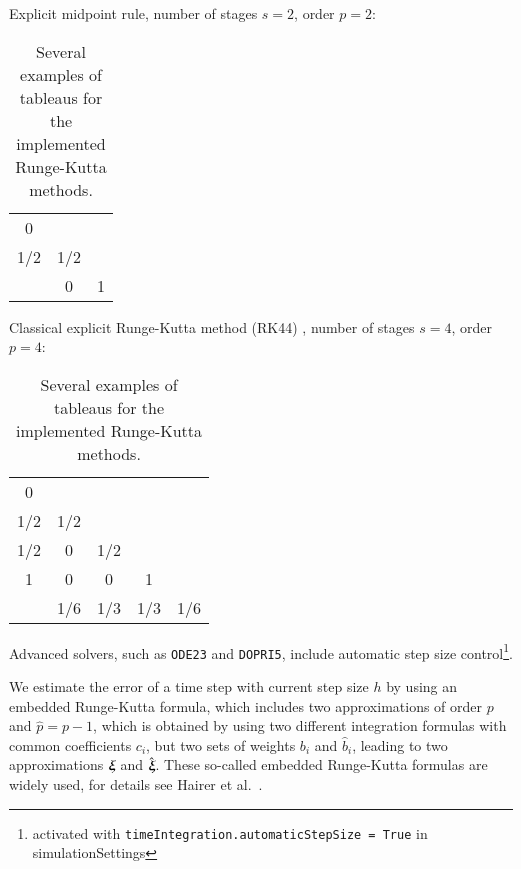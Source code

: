 {\begin{table}
Explicit midpoint rule, number of stages $s=2$, order $p=2$:\\
\begin{center}
\begin{tabular}{c|c c} %
0 &  &  \\ %
1/2 & 1/2 &  \\ \hline 
 & 0 & 1 \\ %
\end{tabular} \vspace{0.5cm}
\end{center}

Classical explicit Runge-Kutta method (RK44) , number of stages $s=4$, order $p=4$:\\
\begin{center}
\begin{tabular}{c|c c c c }
0 &  &  &  &  \\ %
1/2 & 1/2 &  &  &  \\ %
1/2 & 0 & 1/2 &  &  \\ %
1 & 0 & 0 & 1 &  \\ \hline 
 & 1/6 & 1/3 & 1/3 & 1/6 \\ %
\end{tabular}
\end{center}
%
\caption{Several examples of tableaus for the implemented Runge-Kutta methods.}
\label{tab:rungeKuttaTableaus}
\end{table}
}
%
%
Advanced solvers, such as \texttt{ODE23} and \texttt{DOPRI5}, include automatic step size control\footnote{activated with
\texttt{timeIntegration.automaticStepSize = True} in simulationSettings}.

We estimate the error of a time step with current step size $h$ by
using an embedded Runge-Kutta formula, which includes two approximations  of order $p$ and $\hat p = p-1$, which is obtained by using two different integration formulas with common coefficients $c_i$, but two sets of weights $b_i$ and $\hat b_i$, leading to two approximations $\mbox{\boldmath $\xi$ \unboldmath}\!\!$ and $\hat {\mbox{\boldmath $\xi$ \unboldmath}\!\!}$. These so-called embedded Runge-Kutta formulas are widely used, for details see Hairer et al.\ \cite{Hairer1987}. 

